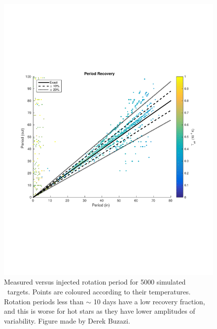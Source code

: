 \begin{figure}
\begin{center}
\includegraphics[width=6in, clip=true]{figures/figure6.pdf}
\caption[\LSST\ rotation period recovery results.]
{Measured versus injected rotation period for 5000 simulated \LSST\ targets.
Points are coloured according to their temperatures.
Rotation periods less than $\sim$ 10 days have a low recovery fraction, and
this is worse for hot stars as they have lower amplitudes of variability.
Figure made by Derek Buzazi.}
\label{fig:derek}
\end{center}
\end{figure}

